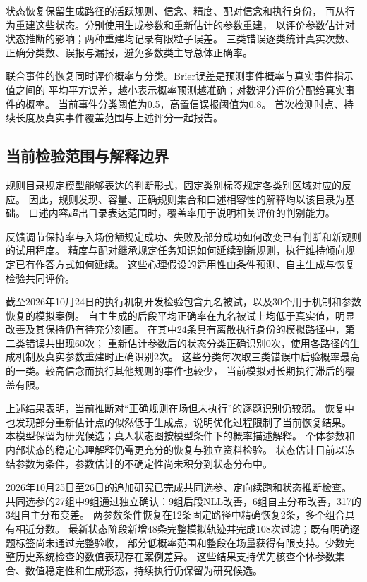 \documentclass[11pt,a4paper]{article}
\numberwithin{equation}{section}
\begin{document}
状态恢复保留生成路径的活跃规则、信念、精度、配对信念和执行身份，
再从行为重建这些状态。分别使用生成参数和重新估计的参数重建，
以评价参数估计对状态推断的影响；两种重建均记录有限粒子误差。
三类错误逐类统计真实次数、正确分类数、误报与漏报，避免多数类主导总体正确率。

联合事件的恢复同时评价概率与分类。Brier误差是预测事件概率与真实事件指示值之间的
平均平方误差，越小表示概率预测越准确；对数评分评价分配给真实事件的概率。
当前事件分类阈值为0.5，高置信误报阈值为0.8。
首次检测时点、持续长度及真实事件覆盖范围与上述评分一起报告。

\subsection{当前检验范围与解释边界}
规则目录规定模型能够表达的判断形式，固定类别标签规定各类别区域对应的反应。
因此，规则发现、容量、正确规则集合和口述相容性的解释均以该目录为基础。
口述内容超出目录表达范围时，覆盖率用于说明相关评价的判别能力。

反馈调节保持率与入场份额规定成功、失败及部分成功如何改变已有判断和新规则的试用程度。
精度与配对继承规定任务知识如何延续到新规则，执行维持倾向规定已有作答方式如何延续。
这些心理假设的适用性由条件预测、自主生成与恢复检验共同评价。

截至2026年10月24日的执行机制开发检验包含九名被试，以及30个用于机制和参数恢复的模拟案例。
自主生成的后段平均正确率在九名被试上均低于真实值，明显改善及其保持仍有待充分刻画。
在其中24条具有离散执行身份的模拟路径中，第二类错误共出现60次；
重新估计参数后的状态分类正确识别0次，使用各路径的生成机制及真实参数重建时正确识别2次。
这些分类每次取三类错误中后验概率最高的一类。较高信念而执行其他规则的事件也较少，
当前模拟对长期执行滞后的覆盖有限。

上述结果表明，当前推断对“正确规则在场但未执行”的逐题识别仍较弱。
恢复中也发现部分重新估计点的似然低于生成点，说明优化过程限制了当前恢复结果。
本模型保留为研究候选；真人状态图按模型条件下的概率描述解释。
个体参数和内部状态的稳定心理解释仍需更充分的恢复与独立资料检验。
状态估计目前以冻结参数为条件，参数估计的不确定性尚未积分到状态分布中。

2026年10月25日至26日的追加研究已完成共同选参、定向续跑和状态推断检查。
共同选参的27组中9组通过独立确认：9组后段NLL改善，6组自主分布改善，317的3组自主分布变差。
两参数条件恢复在12条固定路径中精确恢复2条，多个组合具有相近分数。
最新状态阶段新增48条完整模拟轨迹并完成108次过滤；既有明确逐题标签尚未通过完整验收，
部分低概率范围和整段在场量获得有限支持。少数完整历史系统检查的数值表现存在案例差异。
这些结果支持优先核查个体参数集合、数值稳定性和生成形态，持续执行仍保留为研究候选。
\end{document}
